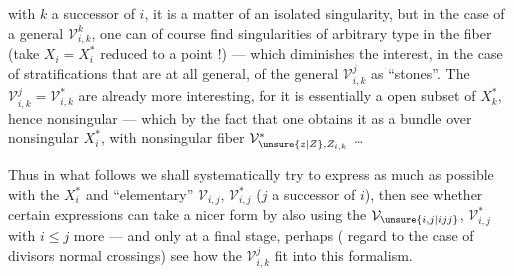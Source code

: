 with $k$ a successor of $i$, it is a matter of an isolated singularity, but in the case of a general $\mathcal{V}_{i,k}^k$, one can of course find singularities of arbitrary type in the fiber (take $X_i=X_i^*$ reduced to a point !) — which diminishes the interest, in the case of stratifications that are at all general, of the general $\mathcal{V}_{i,k}^j$ as ``stones''. The $\mathcal{V}_{i,k}^{j}=\mathcal{V}_{i,k}^*$ are already more interesting, for  it is essentially a  open subset of $X_k^*$, hence nonsingular — which  by the fact that one obtains it as a bundle over nonsingular $X_i^*$, with nonsingular fiber $\mathcal{V}_{\unsure{z|Z},Z_{i,k}}^*$ \ldots

Thus in what follows we shall systematically try to express as much as possible with the $X_i^*$ and  ``elementary'' $\mathcal{V}_{i,j}$, $\mathcal{V}_{i,j}^*$ ($j$ a successor of $i$), then see whether certain expressions can take a nicer form by also using  the $\mathcal{V}_{\unsure{i,j|ijj}}$, $\mathcal{V}_{i,j}^*$ with $i\leq j$  more — and only at a final stage, perhaps ( regard to the case of divisors  normal crossings) see how the $\mathcal{V}_{i,k}^j$ fit into this formalism.
